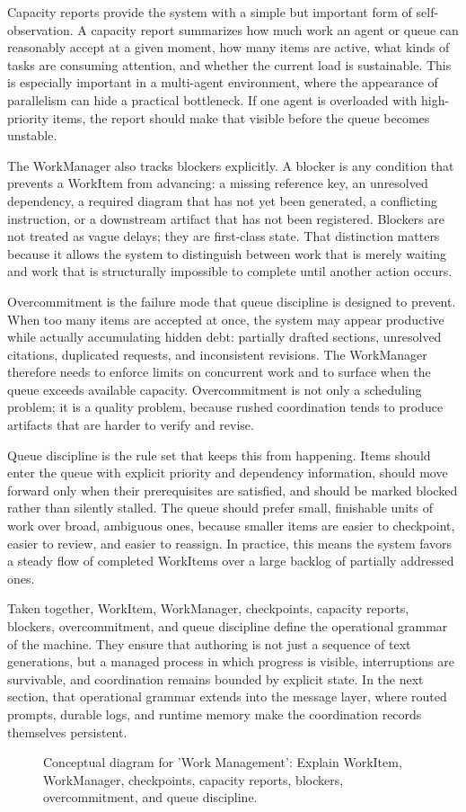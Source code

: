 \documentclass[11pt]{article}
\begin{document}
Capacity reports provide the system with a simple but important form of self-observation. A capacity report summarizes how much work an agent or queue can reasonably accept at a given moment, how many items are active, what kinds of tasks are consuming attention, and whether the current load is sustainable. This is especially important in a multi-agent environment, where the appearance of parallelism can hide a practical bottleneck. If one agent is overloaded with high-priority items, the report should make that visible before the queue becomes unstable.

The WorkManager also tracks blockers explicitly. A blocker is any condition that prevents a WorkItem from advancing: a missing reference key, an unresolved dependency, a required diagram that has not yet been generated, a conflicting instruction, or a downstream artifact that has not been registered. Blockers are not treated as vague delays; they are first-class state. That distinction matters because it allows the system to distinguish between work that is merely waiting and work that is structurally impossible to complete until another action occurs.

Overcommitment is the failure mode that queue discipline is designed to prevent. When too many items are accepted at once, the system may appear productive while actually accumulating hidden debt: partially drafted sections, unresolved citations, duplicated requests, and inconsistent revisions. The WorkManager therefore needs to enforce limits on concurrent work and to surface when the queue exceeds available capacity. Overcommitment is not only a scheduling problem; it is a quality problem, because rushed coordination tends to produce artifacts that are harder to verify and revise.

Queue discipline is the rule set that keeps this from happening. Items should enter the queue with explicit priority and dependency information, should move forward only when their prerequisites are satisfied, and should be marked blocked rather than silently stalled. The queue should prefer small, finishable units of work over broad, ambiguous ones, because smaller items are easier to checkpoint, easier to review, and easier to reassign. In practice, this means the system favors a steady flow of completed WorkItems over a large backlog of partially addressed ones.

Taken together, WorkItem, WorkManager, checkpoints, capacity reports, blockers, overcommitment, and queue discipline define the operational grammar of the machine. They ensure that authoring is not just a sequence of text generations, but a managed process in which progress is visible, interruptions are survivable, and coordination remains bounded by explicit state. In the next section, that operational grammar extends into the message layer, where routed prompts, durable logs, and runtime memory make the coordination records themselves persistent.

\begin{figure}[htbp]
\centering

\caption{Conceptual diagram for 'Work Management': Explain WorkItem, WorkManager, checkpoints, capacity reports, blockers, overcommitment, and queue discipline.}
\end{figure}
\end{document}
